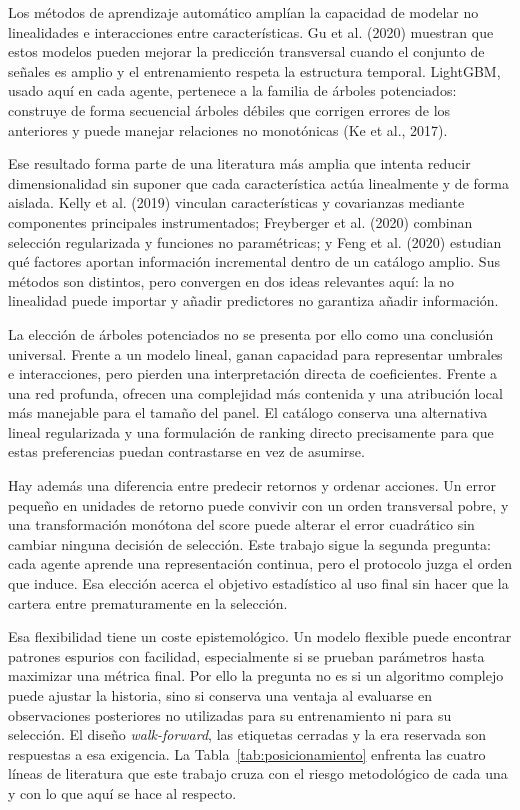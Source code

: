 Los métodos de aprendizaje automático amplían la capacidad de modelar no linealidades e
interacciones entre características. Gu et al. (2020) muestran que estos modelos pueden
mejorar la predicción transversal cuando el conjunto de señales es amplio y el entrenamiento respeta
la estructura temporal. LightGBM, usado aquí en cada agente, pertenece a la familia de árboles
potenciados: construye de forma secuencial árboles débiles que corrigen errores de los anteriores y
puede manejar relaciones no monotónicas (Ke et al., 2017).

Ese resultado forma parte de una literatura más amplia que intenta reducir dimensionalidad sin
suponer que cada característica actúa linealmente y de forma aislada. Kelly et al. (2019) vinculan
características y covarianzas mediante componentes principales instrumentados; Freyberger et al.
(2020) combinan selección regularizada y funciones no paramétricas; y Feng et al. (2020) estudian
qué factores aportan información incremental dentro de un catálogo amplio. Sus métodos son
distintos, pero convergen en dos ideas relevantes aquí: la no linealidad puede importar y añadir
predictores no garantiza añadir información.

La elección de árboles potenciados no se presenta por ello como una conclusión universal. Frente a
un modelo lineal, ganan capacidad para representar umbrales e interacciones, pero pierden una
interpretación directa de coeficientes. Frente a una red profunda, ofrecen una complejidad más
contenida y una atribución local más manejable para el tamaño del panel. El catálogo conserva una
alternativa lineal regularizada y una formulación de ranking directo precisamente para que estas
preferencias puedan contrastarse en vez de asumirse.

Hay además una diferencia entre predecir retornos y ordenar acciones. Un error pequeño en unidades
de retorno puede convivir con un orden transversal pobre, y una transformación monótona del score
puede alterar el error cuadrático sin cambiar ninguna decisión de selección. Este trabajo sigue la
segunda pregunta: cada agente aprende una representación continua, pero el protocolo juzga el orden
que induce. Esa elección acerca el objetivo estadístico al uso final sin hacer que la cartera entre
prematuramente en la selección.

Esa flexibilidad tiene un coste epistemológico. Un modelo flexible puede encontrar patrones espurios
con facilidad, especialmente si se prueban parámetros hasta maximizar una métrica final. Por ello la
pregunta no es si un algoritmo complejo puede ajustar la historia, sino si conserva una ventaja al
evaluarse en observaciones posteriores no utilizadas para su entrenamiento ni para su selección.
El diseño \textit{walk-forward}, las etiquetas cerradas y la era reservada son respuestas a esa
exigencia. La Tabla~\ref{tab:posicionamiento} enfrenta las cuatro líneas de literatura que este
trabajo cruza con el riesgo metodológico de cada una y con lo que aquí se hace al respecto.

